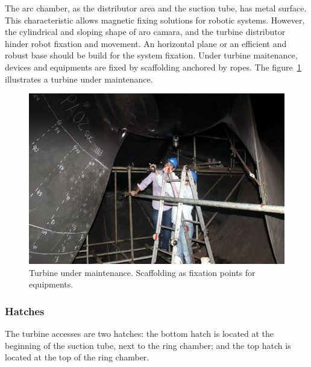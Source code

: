 The arc chamber, as the distributor area and the suction tube, has metal
surface. This characteristic allows magnetic fixing solutions for robotic
systems. However, the cylindrical and sloping shape of aro camara, and the
turbine distributor hinder robot fixation and movement. An horizontal plane or
an efficient and robust base should be build for the system fixation.
Under turbine maitenance, devices and equipments are fixed by scaffolding
anchored by ropes. The figure~\ref{fig::andaime} illustrates a turbine under
maintenance.


\begin{figure}[h!]	
	\includegraphics[width=\columnwidth]{figs/viagem/2015_04_28/UG/img_4969}
	\caption{Turbine under maintenance. Scaffolding as fixation points for
	equipments.}
	\label{fig::andaime}
\end{figure}

 
\subsubsection{Hatches}
The turbine accesses are two hatches: the bottom hatch is located at the
beginning of the suction tube, next to the ring chamber; and the top hatch is
located at the top of the ring chamber.

